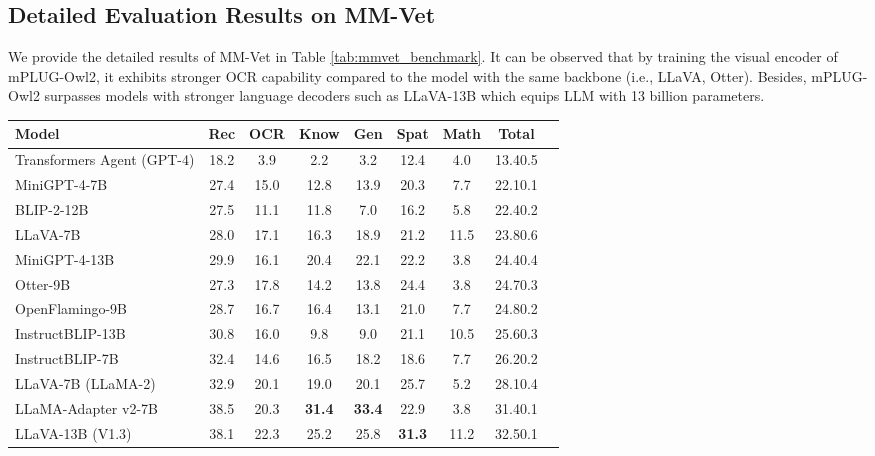 \documentclass[10pt,twocolumn,letterpaper]{article}
\newlength\savewidth
\newcommand\shline{\noalign{\global\savewidth\arrayrulewidth\global\arrayrulewidth 1pt}\hline\noalign{\global\arrayrulewidth\savewidth}}
\newcommand{\modelname}{mPLUG-Owl2\xspace}
\begin{document}
\subsection{Detailed Evaluation Results on MM-Vet}
We provide the detailed results of MM-Vet in Table \ref{tab:mmvet_benchmark}. It can be observed that by training the visual encoder of \modelname, it exhibits stronger OCR capability compared to the model with the same backbone (i.e., LLaVA, Otter). Besides, \modelname surpasses models with stronger language decoders such as LLaVA-13B which equips LLM with 13 billion parameters.

\begin{table*}[t]
  \centering
    \begin{tabular}{lcccccccc}
    \shline
        Model & Rec & OCR & Know & Gen & Spat & Math & Total  \\ 
        \hline
        Transformers Agent (GPT-4) \cite{OpenAI2023gpt4} & 18.2 & 3.9 & 2.2 & 3.2 & 12.4 & 4.0 & 13.40.5 \\
        MiniGPT-4-7B \cite{Zhu2023MiniGPT4} & 27.4 & 15.0 & 12.8 & 13.9 & 20.3 & 7.7 & 22.10.1  \\ 
        BLIP-2-12B \cite{Li2023BLIP2} &  27.5 & 11.1 & 11.8 & 7.0 & 16.2 & 5.8 & 22.40.2 \\ 
        LLaVA-7B \cite{Liu2023Llava} & 28.0 & 17.1 & 16.3 & 18.9 & 21.2 &  11.5 & 23.80.6 \\ 
        MiniGPT-4-13B \cite{Zhu2023MiniGPT4} & 29.9 & 16.1 & 20.4 & 22.1 & 22.2 & 3.8 & 24.40.4 \\
        Otter-9B \cite{Li2023Otter} & 27.3 & 17.8 & 14.2 & 13.8 & 24.4 & 3.8 & 24.70.3 \\ 
        OpenFlamingo-9B \cite{awadalla2023openflamingo} & 28.7 & 16.7 & 16.4 & 13.1 & 21.0 & 7.7 & 24.80.2 \\
        InstructBLIP-13B \cite{Dai2023InstructBLIP} & 30.8 & 16.0 & 9.8 & 9.0 & 21.1 & 10.5 & 25.60.3 \\
        InstructBLIP-7B \cite{Dai2023InstructBLIP} & 32.4 & 14.6 & 16.5 & 18.2 & 18.6 & 7.7 & 26.20.2 \\
        LLaVA-7B (LLaMA-2) \cite{Liu2023Llava} & 32.9 & 20.1 & 19.0 & 20.1 & 25.7 & 5.2 & 28.10.4 \\
        LLaMA-Adapter v2-7B \cite{Gao2023LLaMAAdapterV2} &  38.5 & 20.3 &  \textbf{31.4} &  \textbf{33.4} & 22.9 & 3.8 & 31.40.1 \\
        LLaVA-13B (V1.3) \cite{Liu2023Llava} &  38.1 & 22.3 & 25.2 & 25.8 &  \textbf{31.3} & 11.2 &  32.50.1 \\

\end{tabular}
\end{table*}
\end{document}
